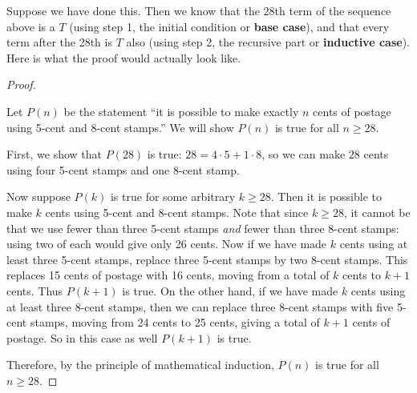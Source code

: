 \documentclass[12pt,]{book}
\newcommand{\terminology}[1]{\textbf{#1}}
\theoremstyle{plain}
\theoremstyle{definition}
\theoremstyle{definition}
\theoremstyle{definition}
\numberwithin{equation}{chapter}
\begin{document}
\hypertarget{p-377}{}%
Suppose we have done this. Then we know that the 28th term of the sequence above is a \(T\) (using step 1, the initial condition or \terminology{base case}), and that every term after the 28th is \(T\) also (using step 2, the recursive part or \terminology{inductive case}). Here is what the proof would actually look like.%
\begin{proof}\hypertarget{proof-1}{}
\hypertarget{p-378}{}%
Let \(P(n)\) be the statement ``it is possible to make exactly \(n\) cents of postage using 5-cent and 8-cent stamps.'' We will show \(P(n)\) is true for all \(n \ge 28\).%
\par
\hypertarget{p-379}{}%
First, we show that \(P(28)\) is true: \(28 =  4 \cdot 5+ 1\cdot 8\), so we can make \(28\) cents using four 5-cent stamps and one 8-cent stamp.%
\par
\hypertarget{p-380}{}%
Now suppose \(P(k)\) is true for some arbitrary \(k \ge 28\). Then it is possible to make \(k\) cents using 5-cent and 8-cent stamps. Note that since \(k \ge 28\), it cannot be that we use fewer than three 5-cent stamps \emph{and} fewer than three 8-cent stamps: using two of each would give only 26 cents. Now if we have made \(k\) cents using at least three 5-cent stamps, replace three 5-cent stamps by two 8-cent stamps. This replaces 15 cents of postage with 16 cents, moving from a total of \(k\) cents to \(k+1\) cents. Thus \(P(k+1)\) is true. On the other hand, if we have made \(k\) cents using at least three 8-cent stamps, then we can replace three 8-cent stamps with five 5-cent stamps, moving from 24 cents to 25 cents, giving a total of \(k+1\) cents of postage. So in this case as well \(P(k+1)\) is true.%
\par
\hypertarget{p-381}{}%
Therefore, by the principle of mathematical induction, \(P(n)\) is true for all \(n \ge 28\).%
\end{proof}
\typeout{************************************************}
\typeout{************************************************}
\end{document}
